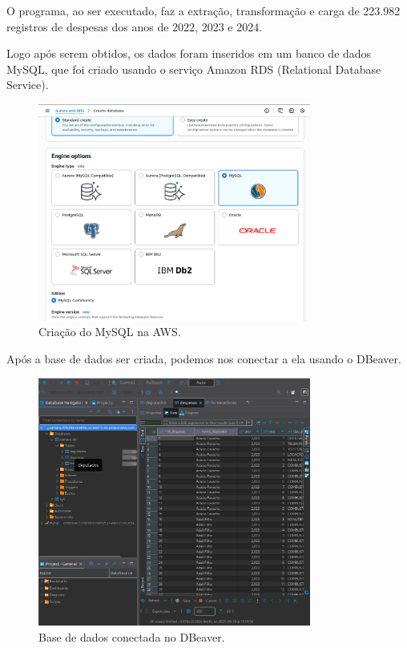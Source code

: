 \documentclass[12pt, a4paper]{article}
\begin{document}
O programa, ao ser executado, faz a extração, transformação e carga de 223.982 registros de despesas dos anos de 2022, 2023 e 2024.

Logo após serem obtidos, os dados foram inseridos em um banco de dados MySQL, que foi criado usando o serviço Amazon RDS (Relational Database Service).

\begin{figure}[!htbp]
    \centering
    \includegraphics[width=0.8\textwidth]{assets/1_criacao.png}
    \caption{Criação do MySQL na AWS.}
    \label{fig:criacao_mysql}
\end{figure}
\newpage

Após a base de dados ser criada, podemos nos conectar a ela usando o DBeaver\cite{dbeaver}.

\begin{figure}[!htbp]
    \centering
    \includegraphics[width=0.8\textwidth]{assets/1_dbeaver.png}
    \caption{Base de dados conectada no DBeaver.}
    \label{fig:db conexão}
\end{figure}
\end{document}
